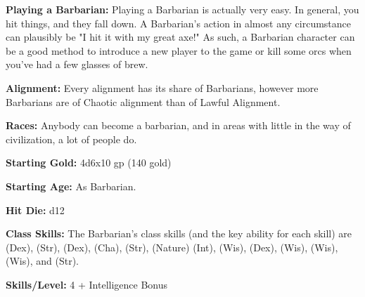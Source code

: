 
\textbf{Playing a Barbarian:} Playing a Barbarian is actually very easy. In general, you hit things, and they fall down. A Barbarian's action in almost any circumstance can plausibly be "I hit it with my great axe!" As such, a Barbarian character can be a good method to introduce a new player to the game or kill some orcs when you've had a few glasses of brew.

\textbf{Alignment:} Every alignment has its share of Barbarians, however more Barbarians are of Chaotic alignment than of Lawful Alignment.

\textbf{Races:} Anybody can become a barbarian, and in areas with little in the way of civilization, a lot of people do.

\textbf{Starting Gold:} 4d6x10 gp (140 gold)

\textbf{Starting Age:} As Barbarian.

\textbf{Hit Die:} d12

\textbf{Class Skills:} The Barbarian's class skills (and the key ability for each skill) are  (Dex),  (Str),  (Dex),  (Cha),  (Str),  (Nature) (Int),  (Wis),  (Dex),  (Wis),  (Wis),  (Wis), and  (Str).

\textbf{Skills/Level:} 4 + Intelligence Bonus



\goodbab{}
\goodfor{}
\poorref{}
\poorwil{}

\begin{classtable}
\end{classtable}

